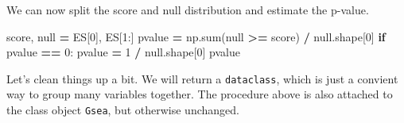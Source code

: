 \documentclass[
]{book}
\newenvironment{Shaded}{\begin{snugshade}}{\end{snugshade}}
\newcommand{\BuiltInTok}[1]{#1}
\newcommand{\ControlFlowTok}[1]{\textcolor[rgb]{0.13,0.29,0.53}{\textbf{#1}}}
\newcommand{\DecValTok}[1]{\textcolor[rgb]{0.00,0.00,0.81}{#1}}
\newcommand{\NormalTok}[1]{#1}
\newcommand{\OperatorTok}[1]{\textcolor[rgb]{0.81,0.36,0.00}{\textbf{#1}}}
\begin{document}
We can now split the score and null distribution and estimate the p-value.

\begin{Shaded}
\begin{Highlighting}[numbers=left,,]
\NormalTok{score, null }\OperatorTok{=}\NormalTok{ ES[}\DecValTok{0}\NormalTok{], ES[}\DecValTok{1}\NormalTok{:]}
\NormalTok{pvalue }\OperatorTok{=}\NormalTok{ np.}\BuiltInTok{sum}\NormalTok{(null }\OperatorTok{\textgreater{}=}\NormalTok{ score) }\OperatorTok{/}\NormalTok{ null.shape[}\DecValTok{0}\NormalTok{]}
\ControlFlowTok{if}\NormalTok{ pvalue }\OperatorTok{==} \DecValTok{0}\NormalTok{:}
\NormalTok{    pvalue }\OperatorTok{=} \DecValTok{1} \OperatorTok{/}\NormalTok{ null.shape[}\DecValTok{0}\NormalTok{]}
\NormalTok{pvalue}
\end{Highlighting}
\end{Shaded}

Let's clean things up a bit. We will return a \texttt{dataclass}, which is just a convient way to group many variables together.
The procedure above is also attached to the class object \texttt{Gsea}, but otherwise unchanged.
\end{document}

